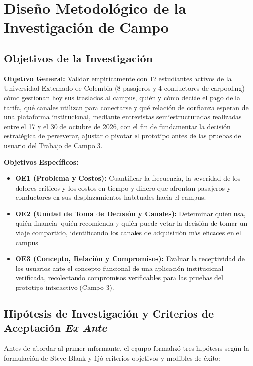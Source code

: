 \documentclass[11pt,a4paper]{article}
\begin{document}
\section{Dise\~no Metodol\'ogico de la Investigaci\'on de Campo}

\subsection{Objetivos de la Investigaci\'on}
\textbf{Objetivo General:} Validar emp\'iricamente con 12 estudiantes activos de la Universidad Externado de Colombia (8 pasajeros y 4 conductores de carpooling) c\'omo gestionan hoy sus traslados al campus, qui\'en y c\'omo decide el pago de la tarifa, qu\'e canales utilizan para conectarse y qu\'e relaci\'on de confianza esperan de una plataforma institucional, mediante entrevistas semiestructuradas realizadas entre el 17 y el 30 de octubre de 2026, con el fin de fundamentar la decisi\'on estrat\'egica de perseverar, ajustar o pivotar el prototipo antes de las pruebas de usuario del Trabajo de Campo 3.

\textbf{Objetivos Espec\'ificos:}
\begin{itemize}[leftmargin=*]
    \item \textbf{OE1 (Problema y Costos):} Cuantificar la frecuencia, la severidad de los dolores cr\'iticos y los costos en tiempo y dinero que afrontan pasajeros y conductores en sus desplazamientos habituales hacia el campus.
    \item \textbf{OE2 (Unidad de Toma de Decisi\'on y Canales):} Determinar qui\'en usa, qui\'en financia, qui\'en recomienda y qui\'en puede vetar la decisi\'on de tomar un viaje compartido, identificando los canales de adquisici\'on m\'as eficaces en el campus.
    \item \textbf{OE3 (Concepto, Relaci\'on y Compromisos):} Evaluar la receptividad de los usuarios ante el concepto funcional de una aplicaci\'on institucional verificada, recolectando compromisos verificables para las pruebas del prototipo interactivo (Campo 3).
\end{itemize}

\subsection{Hip\'otesis de Investigaci\'on y Criterios de Aceptaci\'on \textit{Ex Ante}}
Antes de abordar al primer informante, el equipo formaliz\'o tres hip\'otesis seg\'un la formulaci\'on de Steve Blank y fij\'o criterios objetivos y medibles de \'exito:
\end{document}
